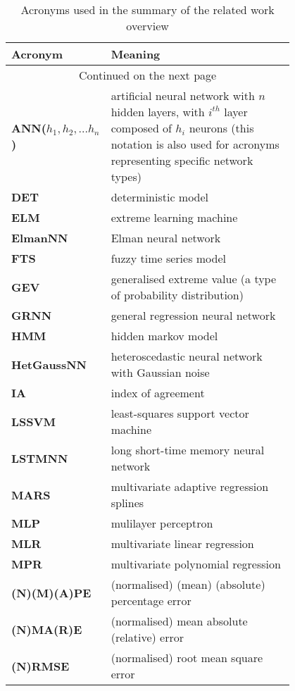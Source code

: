 {
\renewcommand\arraystretch{1}
\begingroup\footnotesize
\begin{longtable}{l>{\raggedright\arraybackslash}p{0.8\linewidth}%
}
\caption{Acronyms used in the summary of the related work overview} \\ 
  \toprule
  Acronym & Meaning \\
\midrule
\endhead
\bottomrule
\multicolumn{2}{c}{Continued on the next page} \\
\bottomrule
\endfoot
\bottomrule
\endlastfoot 
\textbf{ ANN($h_1, h_2, ... h_n$) } &  artificial neural network with $n$ hidden layers, with $i^{th}$ layer composed of $h_i$ neurons (this notation is also used for acronyms representing specific network types) \\ 
  \textbf{ DET } &  deterministic model \\ 
  \textbf{ ELM } &  extreme learning machine \\ 
  \textbf{ ElmanNN } &  Elman neural network \\ 
  \textbf{ FTS } &  fuzzy time series model \\ 
  \textbf{ GEV } &  generalised extreme value (a type of probability distribution) \\ 
  \textbf{ GRNN } &  general regression neural network \\ 
  \textbf{ HMM } &  hidden markov model \\ 
  \textbf{ HetGaussNN } &  heteroscedastic neural network with Gaussian noise \\ 
  \textbf{ IA } &  index of agreement \\ 
  \textbf{ LSSVM } &  least-squares support vector machine \\ 
  \textbf{ LSTMNN } &  long short-time memory neural network \\ 
  \textbf{ MARS } &  multivariate adaptive regression splines \\ 
  \textbf{ MLP } &  mulilayer perceptron \\ 
  \textbf{ MLR } &  multivariate linear regression \\ 
  \textbf{ MPR } &  multivariate polynomial regression \\ 
  \textbf{ (N)(M)(A)PE } &  (normalised) (mean) (absolute) percentage error \\ 
  \textbf{ (N)MA(R)E } &  (normalised) mean absolute (relative) error \\ 
  \textbf{ (N)RMSE } &  (normalised) root mean square error \\ 

\end{longtable}}
